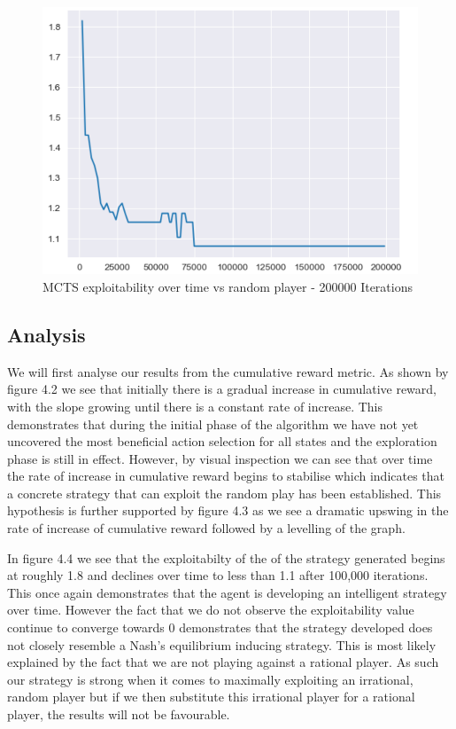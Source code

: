 \begin{figure}[ht]
    \includegraphics[scale=.8]{images/exploitability_vs_random_player.PNG}
    \caption{MCTS exploitability over time vs random player - 200000 Iterations}
\end{figure}

\subsection{Analysis}\label{subsec:analysis1}
We will first analyse our results from the cumulative reward metric.
As shown by figure 4.2 we see that initially there is a gradual increase in cumulative reward,
with the slope growing until there is a constant rate of increase.
This demonstrates that during the initial phase of the algorithm we have not yet uncovered
the most beneficial action selection for all states and the exploration phase is still in effect.
However, by visual inspection we can see that over time the rate of increase in cumulative
reward begins to stabilise which indicates that a concrete strategy that can exploit
the random play has been established.
This hypothesis is further supported by figure 4.3 as we see a dramatic upswing
in the rate of increase of cumulative reward followed by a levelling of the graph.

In figure 4.4 we see that the exploitabilty of the of the strategy generated begins
at roughly 1.8 and declines over time to less than 1.1 after 100,000 iterations.
This once again demonstrates that the agent is developing an intelligent strategy over time.
However the fact that we do not observe the exploitability value continue to converge towards
0 demonstrates that the strategy developed does not closely resemble a Nash's equilibrium
inducing strategy.
This is most likely explained by the fact that we are not playing against a rational player.
As such our strategy is strong when it comes to maximally exploiting an irrational, random player
but if we then substitute this irrational player for a rational player, the results will not be favourable.
